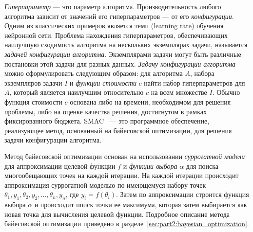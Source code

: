 \textit{Гиперпараметр} --- это параметр алгоритма.
Производительность любого алгоритма зависит от значений его гиперпараметров --- от его \emph{конфигурации}.
Одним из классических примеров является темп (learning rate) обучения нейронной сети.
Проблема нахождения гиперпараметров, обеспечивающих наилучшую сходимость алгоритма на нескольких экземплярах задачи, называется \textit{задачей конфигурации алгоритма}.
Экземплярами задачи могут быть различные постановки этой задачи для разных данных.
\emph{Задачу конфигурации алгоритма} можно сформулировать следующим образом: для  алгоритма $A$, набора экземпляров задачи $I$ и \textit{функции стоимости}  $c$ найти набор гиперпараметров для $A$, который является наилучшим относительно $c$ на всем множестве $I$.
Обычно функция стоимости $c$ основана либо на времени, необходимом для решения проблемы, либо на оценке качества решения, достигнутом в рамках фиксированного бюджета.
SMAC~\cite{hutter2011sequential, lindauer2021smac3} --- это программное обеспечение, реализующее метод, основанный на байесовской оптимизации, для решения задачи конфигурации алгоритма.

Метод байесовской оптимизации основан на использовании \textit{суррогатной модели} для аппроксимации целевой функции $f$ и \textit{функции выбора} $\alpha$ для поиска многообещающих точек на каждой итерации.
На каждой итерации происходит аппроксимация суррогатной моделью по имеющемуся набору точек $\theta_1, y_1, \theta_2, y_2, \dots, \theta_n, y_n$, где $y_i = f(\theta_i)$.
Затем по аппроксимации строится функция выбора $\alpha$ и происходит поиск точки ее максимума, которая затем выбирается как новая точка для вычисления целевой функции.
Подробное описание метода байесовской оптимизации приведено в разделе~\ref{sec:part2:bayesian_optimization}.

